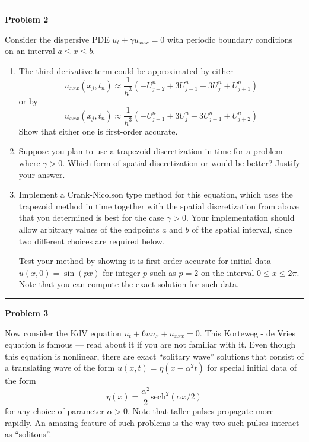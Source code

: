 \documentclass[10pt]{article}
\begin{document}



\vskip 1cm
\hrule
{\bf Problem 2}  

Consider the dispersive PDE $u_t + \gamma u_{xxx} = 0$ with periodic boundary
conditions on an interval $a \leq x \leq b$.  

\begin{enumerate} 
\item The third-derivative term could be approximated by either 
\begin{equation} \label{2a}
u_{xxx}(x_j,t_n) \approx \frac 1 {h^3}(-U_{j-2}^n + 3U_{j-1}^n - 3U_j^n + U_{j+1}^n)
\end{equation} 
or by 
\begin{equation} \label{2b}
u_{xxx}(x_j,t_n) \approx \frac 1 {h^3}(-U_{j-1}^n + 3U_{j}^n - 3U_{j+1}^n + U_{j+2}^n)
\end{equation} 
Show that either one is first-order accurate.  

\item Suppose you plan to use a trapezoid discretization in time for a
problem where $\gamma >0$.  Which form of spatial discretization
 or  would be better?  Justify your answer.

\item Implement a Crank-Nicolson type method for this equation, which uses
the trapezoid method in time together with the spatial discretization from
above that you determined is best for the case $\gamma >0$.
Your implementation should allow arbitrary values of the endpoints $a$ and
$b$ of the spatial interval, since two different choices are required below.

Test your method by showing it is first order accurate 
for initial data $u(x,0) = \sin(px)$ for integer $p$ such as $p=2$ on the
interval $0 \leq x \leq 2\pi$.  Note that 
you can compute the exact solution for such data.
\end{enumerate} 






\vskip 1cm
\hrule
{\bf Problem 3}  

Now consider the KdV equation $u_t + 6uu_x + u_{xxx} = 0$.  
This Korteweg - de Vries equation is famous --- read about it if you are not
familiar with it.  Even though this equation is nonlinear,
there are exact ``solitary wave'' solutions that consist of a translating wave of
the form $u(x,t) = \eta(x-\alpha^2 t)$ for special initial data of the form
\begin{equation} \label{3a}
\eta(x) = \frac {\alpha^2}{2} \text{sech}^2\left(\alpha x/2\right)
\end{equation} 
for any choice of parameter $\alpha >0$.  Note that taller pulses
propagate more rapidly.  An amazing feature of such problems is the
way two such pulses interact as ``solitons''. 
\end{document}
